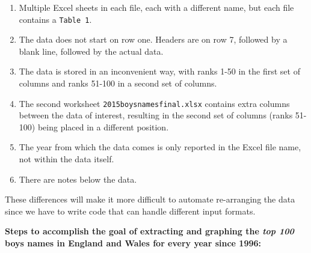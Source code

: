 \documentclass[]{book}
\providecommand{\tightlist}{%
  \setlength{\itemsep}{0pt}\setlength{\parskip}{0pt}}
\begin{document}
\begin{enumerate}
\def\labelenumi{\arabic{enumi}.}
\tightlist
\item
  Multiple Excel sheets in each file, each with a different name, but each file contains a \texttt{Table\ 1}.
\item
  The data does not start on row one. Headers are on row 7, followed by a blank line, followed by the actual data.
\item
  The data is stored in an inconvenient way, with ranks 1-50 in the first set of columns and ranks 51-100 in a second set of columns.
\item
  The second worksheet \texttt{2015boysnamesfinal.xlsx} contains extra columns between the data of interest, resulting in the second set of columns (ranks 51-100) being placed in a different position.
\item
  The year from which the data comes is only reported in the Excel file name, not within the data itself.
\item
  There are notes below the data.
\end{enumerate}

These differences will make it more difficult to automate re-arranging the data since we have to write code that can handle different input formats.

\textbf{Steps to accomplish the goal of extracting and graphing the \emph{top 100} boys names in England and Wales for every year since 1996:}
\end{document}
